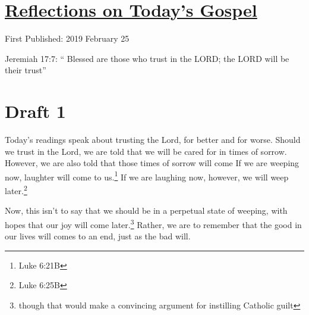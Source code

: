 \documentclass[12pt]{article}[titlepage]
\newcommand{\say}[1]{``#1''}
\newcommand{\1}{\={a}}
\newcommand{\2}{\={e}}
\newcommand{\3}{\={\i}}
\newcommand{\4}{\=o}
\newcommand{\5}{\=u}
\newcommand{\6}{\={A}}
\renewcommand{\,}{\textsuperscript{,}}
\begin{document}
\doublespacing
\section{\href{reflections-on-readings-6-ordinary-c.html}{Reflections on Today's Gospel}}
First Published: 2019 February 25

Jeremiah 17:7: \say{ Blessed are those who trust in the LORD; the LORD will be their trust}

\section{Draft 1}
Today's readings speak about trusting the Lord, for better and for worse.
Should we trust in the Lord, we are told that we will be cared for in times of sorrow.
However, we are also told that those times of sorrow will come
If we are weeping now, laughter will come to us.\footnote{Luke 6:21B}
If we are laughing now, however, we will weep later.\footnote{Luke 6:25B}

Now, this isn't to say that we should be in a perpetual state of weeping, with hopes that our joy will come later.\footnote{though that would make a convincing argument for instilling Catholic guilt}
Rather, we are to remember that the good in our lives will comes to an end, just as the bad will.
\end{document}
